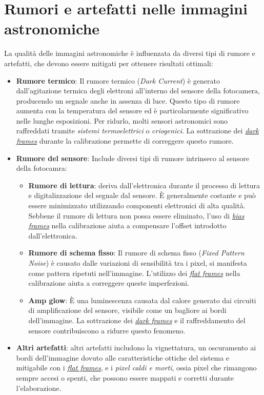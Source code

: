 \section{Rumori e artefatti nelle immagini astronomiche} \label{sec:noise}

La qualità delle immagini astronomiche è influenzata da diversi tipi di rumore e artefatti, che devono essere mitigati per ottenere risultati ottimali:

\begin{itemize}
    \item \textbf{Rumore termico}: Il rumore termico (\textit{Dark Current}) è generato dall'agitazione termica degli elettroni all'interno del sensore della fotocamera, producendo un segnale anche in assenza di luce. Questo tipo di rumore aumenta con la temperatura del sensore ed è particolarmente significativo nelle lunghe esposizioni. Per ridurlo, molti sensori astronomici sono raffreddati tramite \textit{sistemi termoelettrici} o \textit{criogenici}. La sottrazione dei \hyperref[subsec:dark]{\textit{dark frames}} durante la calibrazione permette di correggere questo rumore.
    
    \item \textbf{Rumore del sensore}: Include diversi tipi di rumore intrinseco al sensore della fotocamra:
    
    \begin{itemize}
        \item \textbf{Rumore di lettura}: deriva dall'elettronica durante il processo di lettura e digitalizzazione del segnale dal sensore. È generalmente costante e può essere minimizzato utilizzando componenti elettronici di alta qualità. Sebbene il rumore di lettura non possa essere eliminato, l'uso di \hyperref[subsec:bias]{\textit{bias frames}} nella calibrazione aiuta a compensare l'offset introdotto dall'elettronica.
        
        \item \textbf{Rumore di schema fisso}: Il rumore di schema fisso (\textit{Fixed Pattern Noise}) è causato dalle variazioni di sensibilità tra i pixel, si manifesta come pattern ripetuti nell'immagine. L'utilizzo dei \hyperref[subsec:flat]{\textit{flat frames}} nella calibrazione aiuta a correggere queste imperfezioni.
        
        \item \textbf{Amp glow}: È una luminescenza causata dal calore generato dai circuiti di amplificazione del sensore, visibile come un bagliore ai bordi dell'immagine. La sottrazione dei \hyperref[subsec:dark]{\textit{dark frames}} e il raffreddamento del sensore contribuiscono a ridurre questo fenomeno.
    \end{itemize}
    
    \item \textbf{Altri artefatti}: altri artefatti includono la vignettatura, un oscuramento ai bordi dell'immagine dovuto alle caratteristiche ottiche del sistema e mitigabile con i \hyperref[subsec:flat]{\textit{flat frames}}, e i \textit{pixel caldi e morti},  ossia pixel che rimangono sempre accesi o spenti, che possono essere mappati e corretti durante l'elaborazione.

\end{itemize}

